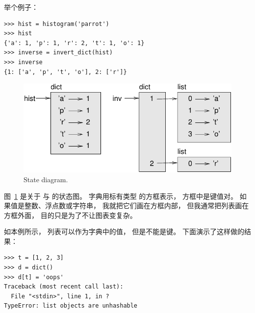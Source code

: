 
举个例子：

\begin{lstlisting}
>>> hist = histogram('parrot')
>>> hist
{'a': 1, 'p': 1, 'r': 2, 't': 1, 'o': 1}
>>> inverse = invert_dict(hist)
>>> inverse
{1: ['a', 'p', 't', 'o'], 2: ['r']}
\end{lstlisting}

\begin{figure}
\centerline
{\includegraphics[scale=0.8]{../source/figs/dict1.pdf}}
\caption{State diagram.}
\label{fig.dict1}
\end{figure}


图~\ref{fig.dict1} 是关于  与  的状态图。  字典用标有类型  的方框表示， 方框中是键值对。  如果值是整数、浮点数或字符串，
我就把它们画在方框内部， 但我通常把列表画在方框外面， 目的只是为了不让图表变复杂。

  


如本例所示， 列表可以作为字典中的值， 但是不能是键。
下面演示了这样做的结果：

  

\begin{lstlisting}
>>> t = [1, 2, 3]
>>> d = dict()
>>> d[t] = 'oops'
Traceback (most recent call last):
  File "<stdin>", line 1, in ?
TypeError: list objects are unhashable
\end{lstlisting}

